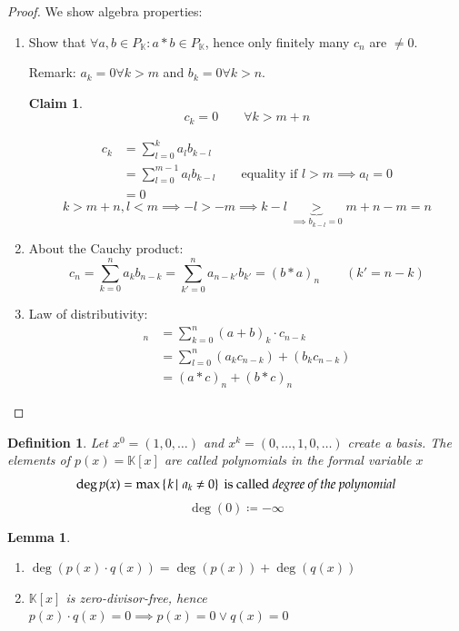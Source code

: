 \documentclass[a4paper]{article}
\newcounter{lecref}[section]
\numberwithin{lecref}{section}
\newtheorem{definition}[lecref]{Definition}
\newtheorem{lemma}[lecref]{Lemma}
\newtheorem*{claim}{Claim}
\newcommand{\setdef}[2]{\left\{\left.#1\,\right|\,#2\right\}}
\begin{document}
\begin{proof}
  We show algebra properties:
  \begin{enumerate}
    \item 
      Show that $\forall a,b \in P_{\mathbb K}: a * b \in P_{\mathbb K}$, hence only finitely many $c_n$ are $\neq 0$.

      Remark: $a_k = 0 \forall k > m$ and $b_k = 0 \forall k > n$.
      \begin{claim}
        \[ c_k = 0 \qquad \forall k > m + n \]
      \end{claim}%
      \begin{align*}
        c_k &= \sum_{l=0}^k a_l b_{k-l} \\
            &= \sum_{l=0}^{m-1} a_l b_{k-l} \qquad \text{equality if $l > m \implies a_l = 0$} \\
            &= 0
      \end{align*}
      \[ k > m + n, l < m \implies -l > -m \implies k - l \underbrace{>}_{\implies b_{k-l} = 0} m + n - m = n \]
    \item
      About the Cauchy product:
      \[ c_n = \sum_{k=0}^n a_k b_{n-k} = \sum_{k'=0}^n a_{n-k'} b_{k'} = (b * a)_n \qquad (k' = n - k) \]

    \item
      Law of distributivity:
      \begin{align*}
        [(a + b) * c]_n &= \sum_{k=0}^n (a + b)_k \cdot c_{n-k} \\
          &= \sum_{l=0}^n (a_k c_{n-k}) + (b_k c_{n-k}) \\
          &= (a * c)_n + (b * c)_n
      \end{align*}
  \end{enumerate}
\end{proof}

\begin{definition} %
  Let $x^0 = (1, 0, \dots)$ and $x^k = (0, \dots, 1, 0, \dots)$ create a basis.
  The elements of $p(x) = \mathbb K[x]$ are called polynomials in the formal variable $x$
  \[ \deg{p(x)} = \max\setdef{k}{a_k \neq 0} \text{ is called \emph{degree of the polynomial}} \]
  \[ \deg(0) \coloneqq -\infty \]
\end{definition}

\begin{lemma}\hfill{} %
  \begin{enumerate}
    \item $\deg(p(x) \cdot q(x)) = \deg(p(x)) + \deg(q(x))$
    \item $\mathbb K[x]$ is zero-divisor-free,
      hence $p(x) \cdot q(x) = 0 \implies p(x) = 0 \lor q(x) = 0$
  \end{enumerate}
\end{lemma}
\end{document}
